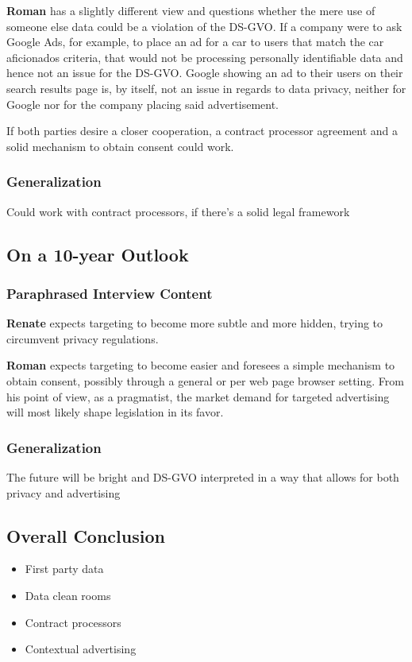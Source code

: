 \textbf{Roman} has a slightly different view and questions whether the mere use of someone else data could be a violation of the DS-GVO. If a company were to ask Google Ads, for example, to place an ad for a car to users that match the car aficionados criteria, that would not be processing personally identifiable data and hence not an issue for the DS-GVO. Google showing an ad to their users on their search results page is, by itself, not an issue in regards to data privacy, neither for Google nor for the company placing said advertisement.

If both parties desire a closer cooperation, a contract processor agreement and a solid mechanism to obtain consent could work.

\subsubsection{Generalization}

Could work with contract processors, if there's a solid legal framework

\subsection{On a 10-year Outlook}

\subsubsection{Paraphrased Interview Content}

\textbf{Renate} expects targeting to become more subtle and more hidden, trying to circumvent privacy regulations.

\textbf{Roman} expects targeting to become easier and foresees a simple mechanism to obtain consent, possibly through a general or per web page browser setting. From his point of view, as a pragmatist, the market demand for targeted advertising will most likely shape legislation in its favor.

\subsubsection{Generalization}

The future will be bright and DS-GVO interpreted in a way that allows for both privacy and advertising

\subsection{Overall Conclusion}

\begin{itemize}
 \item First party data 
 \item Data clean rooms
 \item Contract processors
 \item Contextual advertising
\end{itemize}
